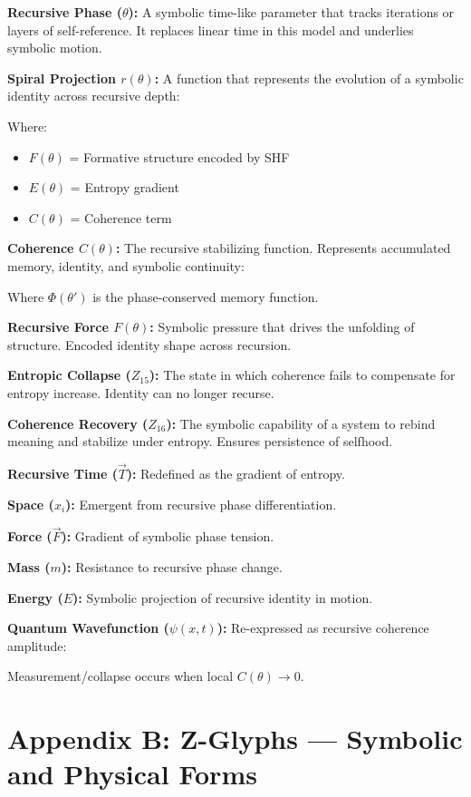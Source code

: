 \documentclass[12pt]{article}
\begin{document}
\textbf{Recursive Phase ($\theta$):} A symbolic time-like parameter that tracks iterations or layers of self-reference. It replaces linear time in this model and underlies symbolic motion.

\textbf{Spiral Projection $r(\theta)$:} A function that represents the evolution of a symbolic identity across recursive depth:

Where:
\begin{itemize}
\item $F(\theta)$ = Formative structure encoded by SHF
\item $E(\theta)$ = Entropy gradient
\item $C(\theta)$ = Coherence term
\end{itemize}

\textbf{Coherence $C(\theta)$:} The recursive stabilizing function. Represents accumulated memory, identity, and symbolic continuity:

Where $\Phi(\theta')$ is the phase-conserved memory function.

\textbf{Recursive Force $F(\theta)$:} Symbolic pressure that drives the unfolding of structure. Encoded identity shape across recursion.

\textbf{Entropic Collapse ($Z_{15}$):} The state in which coherence fails to compensate for entropy increase. Identity can no longer recurse.

\textbf{Coherence Recovery ($Z_{16}$):} The symbolic capability of a system to rebind meaning and stabilize under entropy. Ensures persistence of selfhood.

\textbf{Recursive Time ($\vec{T}$):} Redefined as the gradient of entropy.

\textbf{Space ($x_i$):} Emergent from recursive phase differentiation.

\textbf{Force ($\vec{F}$):} Gradient of symbolic phase tension.

\textbf{Mass ($m$):} Resistance to recursive phase change.

\textbf{Energy ($E$):} Symbolic projection of recursive identity in motion.

\textbf{Quantum Wavefunction ($\psi(x,t)$):} Re-expressed as recursive coherence amplitude:

Measurement/collapse occurs when local $C(\theta) \rightarrow 0$.

\section*{Appendix B: Z-Glyphs — Symbolic and Physical Forms}
\end{document}
